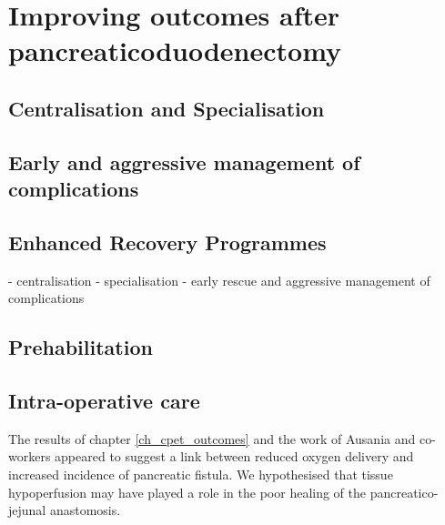 \section{Improving outcomes after pancreaticoduodenectomy}

\subsection{Centralisation and Specialisation}

\subsection{Early and aggressive management of complications}

\subsection{Enhanced Recovery Programmes}


- centralisation
- specialisation
- early rescue and aggressive management of complications \parencite{gouma_rates_2000}



\subsection{Prehabilitation}






\subsection{Intra-operative care}

The results of chapter \ref{ch_cpet_outcomes} and the work of Ausania and co-workers appeared to suggest a link between reduced oxygen delivery and increased incidence of pancreatic fistula. 
We hypothesised that tissue hypoperfusion may have played a role in the poor healing of the pancreatico-jejunal anastomosis. 

